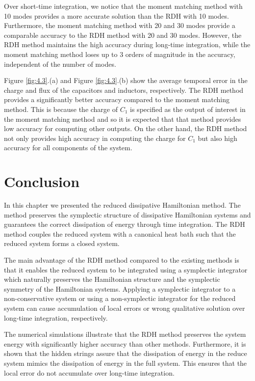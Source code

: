 Over short-time integration, we notice that the moment matching method with 10 modes provides a more accurate solution than the RDH with 10 modes. Furthermore, the moment matching method with 20 and 30 modes provide a comparable accuracy to the RDH method with 20 and 30 modes. However, the RDH method maintains the high accuracy during long-time integration, while the moment matching method loses up to 3 orders of magnitude in the accuracy, independent of the number of modes.

Figure \ref{fig:4.3}.(a) and Figure \ref{fig:4.3}.(b) show the average temporal error in the charge and flux of the capacitors and inductors, respectively. The RDH method provides a significantly better accuracy compared to the moment matching method. This is because the charge of $C_1$ is specified as the output of interest in the moment matching method and so it is expected that that method provides low accuracy for computing other outputs. On the other hand, the RDH method not only provides high accuracy in computing the charge for $C_1$ but also high accuracy for all components of the system.

\section{Conclusion} \label{p3.sec:5}

In this chapter we presented the reduced dissipative Hamiltonian method. The method preserves the symplectic structure of dissipative Hamiltonian systems and guarantees the correct dissipation of energy through time integration. The RDH method couples the reduced system with a canonical heat bath such that the reduced system forms a closed system.

The main advantage of the RDH method compared to the existing methods is that it enables the reduced system to be integrated using a symplectic integrator which naturally preserves the Hamiltonian structure and the symplectic symmetry of the Hamiltonian systems. Applying a symplectic integrator to a non-conservative system or using a non-symplectic integrator for the reduced system can cause accumulation of local errors or wrong qualitative solution over long-time integration, respectively.

The numerical simulations illustrate that the RDH method preserves the system energy with significantly higher accuracy than other methods. Furthermore, it is shown that the hidden strings assure that the dissipation of energy in the reduce system mimics the dissipation of energy in the full system. This ensures that the local error do not accumulate over long-time integration.

